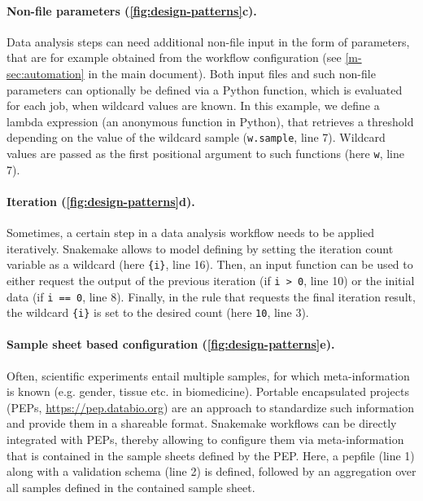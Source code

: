 \documentclass[10pt,a4paper,twocolumn]{article}
\let\plainurl\url
\renewcommand{\url}[1]{\protect\plainurl{#1}}
\begin{document}
\paragraph{Non-file parameters (\autoref{fig:design-patterns}c).}
Data analysis steps can need additional non-file input in the form of parameters, that are for example obtained from the workflow configuration (see \autoref{m-sec:automation} in the main document).
Both input files and such non-file parameters can optionally be defined via a Python function, which is evaluated for each job, when wildcard values are known.
In this example, we define a lambda expression (an anonymous function in Python), that retrieves a threshold depending on the value of the wildcard sample (\lstinline!w.sample!, line 7).
Wildcard values are passed as the first positional argument to such functions (here \lstinline!w!, line 7).

\paragraph{Iteration (\autoref{fig:design-patterns}d).}
Sometimes, a certain step in a data analysis workflow needs to be applied iteratively. Snakemake allows to model defining by setting the iteration count variable as a wildcard (here \lstinline!{i}!, line 16). Then, an input function can be used to either request the output of the previous iteration (if \lstinline!i > 0!, line 10) or the initial data (if \lstinline!i == 0!, line 8). Finally, in the rule that requests the final iteration result, the wildcard \lstinline!{i}! is set to the desired count (here \lstinline!10!, line 3).

\paragraph{Sample sheet based configuration (\autoref{fig:design-patterns}e).}
Often, scientific experiments entail multiple samples, for which meta-information is known (e.g. gender, tissue etc. in biomedicine).
Portable encapsulated projects (PEPs, \url{https://pep.databio.org}) are an approach to standardize such information and provide them in a shareable format.
Snakemake workflows can be directly integrated with PEPs, thereby allowing to configure them via meta-information that is contained in the sample sheets defined by the PEP.
Here, a pepfile (line 1) along with a validation schema (line 2) is defined, followed by an aggregation over all samples defined in the contained sample sheet.
\end{document}
